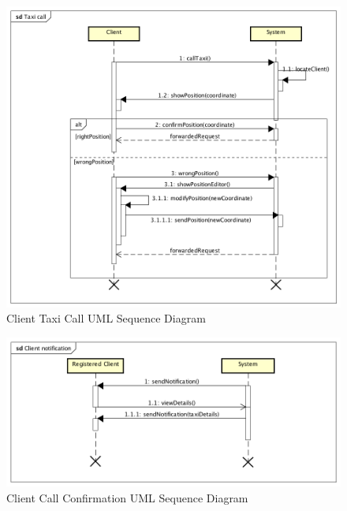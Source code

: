 \documentclass[a4paper]{article}
\begin{document}
\begin{enumerate}[label=\bfseries G\arabic*:]
\begin{figure}[H]
\includegraphics[width=\sequenceWidth]{Sequence-Client-TaxiCall}
\centering
\caption{Client Taxi Call UML Sequence Diagram}
\label{fig:sequenceclienttaxicall}
\end{figure}

\begin{figure}[H]
\includegraphics[width=\sequenceWidth]{Sequence-Client-Notification}
\centering
\caption{Client Call Confirmation UML Sequence Diagram}
\label{fig:sequenceclientnotification}
\end{figure}


\end{enumerate}
\end{document}

